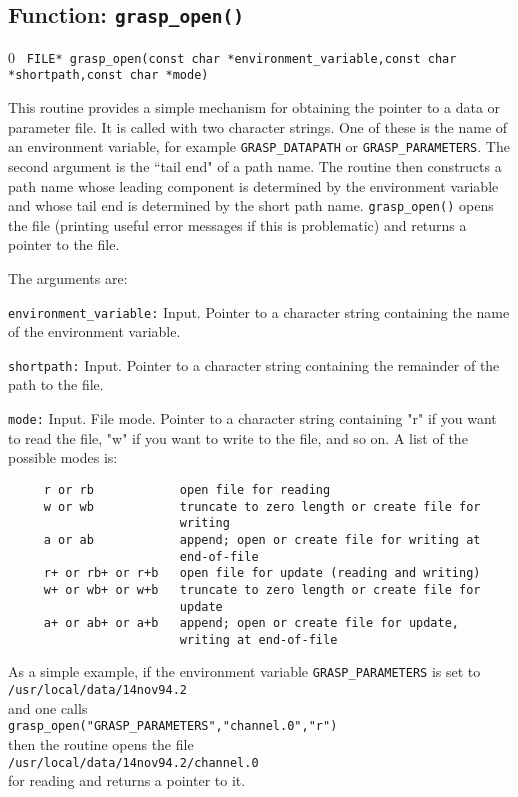 \clearpage
\subsection{Function: {\tt grasp\_open()}}
\label{ss:graspopen}
\setcounter{equation}0
{\tt 
FILE* grasp\_open(const char *environment\_variable,const char *shortpath,const char *mode) }

This routine provides a simple mechanism for obtaining the pointer to a
data or parameter file.  It is called with two character strings.
One of these is the name of an environment variable, for example
{\tt GRASP\_DATAPATH} or {\tt GRASP\_PARAMETERS}.  The second argument
is the ``tail end" of a path name.  The routine then constructs a path
name whose leading component is determined by the environment variable
and whose tail end is determined by the short path name.  {\tt grasp\_open()}
opens the file (printing useful error messages if this is problematic) and
returns a pointer to the file.  

The arguments are:
\begin{description}
\item{\tt environment\_variable:} Input.  Pointer to a character string
   containing the name of the environment variable.
\item{\tt shortpath:} Input.  Pointer to a character string containing
   the remainder of the path to the file.
\item{\tt mode:} Input.  File mode. Pointer to a character string containing
   "r" if you want to read the file, "w" if you want to write to the
   file, and so on.  A list of the possible modes is:
\begin{verbatim}
     r or rb            open file for reading
     w or wb            truncate to zero length or create file for
                        writing
     a or ab            append; open or create file for writing at
                        end-of-file
     r+ or rb+ or r+b   open file for update (reading and writing)
     w+ or wb+ or w+b   truncate to zero length or create file for
                        update
     a+ or ab+ or a+b   append; open or create file for update,
                        writing at end-of-file
\end{verbatim}
\end{description}

As a simple example, if the environment variable {\tt GRASP\_PARAMETERS}
is set to\\
{\tt /usr/local/data/14nov94.2}\\
and one calls\\
{\tt grasp\_open("GRASP\_PARAMETERS","channel.0","r")}\\
then the routine opens the file\\
\mbox{\tt /usr/local/data/14nov94.2/channel.0}\\
for reading and returns a pointer to it.
\clearpage

